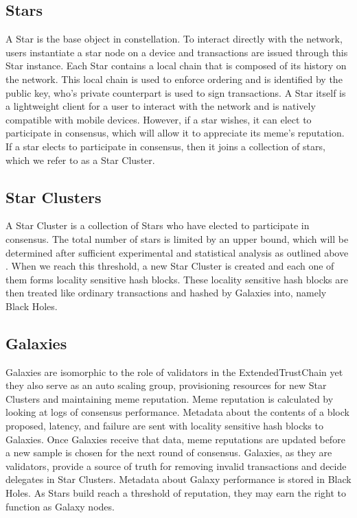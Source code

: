 \documentclass{article}
\begin{document}
\subsection{Stars}
A Star is the base object in constellation. To interact directly with the network, users instantiate a star node on a device and transactions are issued through this Star instance. Each Star contains a local chain that is composed of its history on the network. This local chain is used to enforce ordering and is identified by the public key, who's private counterpart is used to sign transactions. A Star itself is a lightweight client for a user to interact with the network and is natively compatible with mobile devices. However, if a star wishes, it can elect to participate in consensus, which will allow it to appreciate its meme's reputation. If a star elects to participate in consensus, then it joins a collection of stars, which we refer to as a Star Cluster.

\subsection{Star Clusters}
A Star Cluster is a collection of Stars who have elected to participate in consensus. The total number of stars is limited by an upper bound, which will be determined after sufficient experimental and statistical analysis as outlined above  . When we reach this threshold, a new Star Cluster is created and each one of them forms locality sensitive hash blocks. These locality sensitive hash blocks are then treated like ordinary transactions and hashed by Galaxies into, namely Black Holes.

\subsection{Galaxies}
Galaxies are isomorphic to the role of validators in the ExtendedTrustChain yet they also serve as an auto scaling group, provisioning resources for new Star Clusters and maintaining meme reputation. Meme reputation is calculated by looking at logs of consensus performance. Metadata about the contents of a block proposed, latency, and failure are sent with locality sensitive hash blocks to Galaxies. Once Galaxies receive that data, meme reputations are updated before a new sample is chosen for the next round of consensus. Galaxies, as they are validators, provide a source of truth for removing invalid transactions and decide delegates in Star Clusters. Metadata about Galaxy performance is stored in Black Holes. As Stars build reach a threshold of reputation, they may earn the right to function as Galaxy nodes.
\end{document}
